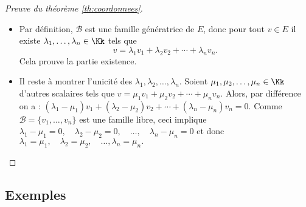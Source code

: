 \documentclass[class=report,crop=false]{standalone}
\begin{document}
\begin{proof}[Preuve du théorème \ref{th:coordonnees}]
~
\begin{itemize}
  \item Par définition, $\mathcal{B}$ est une famille génératrice de $E$,
  donc pour tout $v \in E$ il existe $\lambda_1, \ldots , \lambda_n \in \Kk$ tels que
  $$v = \lambda_1 v_1 + \lambda_2 v_2 + \cdots + \lambda_n v_n.$$
  Cela prouve la partie existence.

  \item Il reste à montrer l'unicité des $\lambda_1, \lambda_2, \ldots , \lambda_n$.
  Soient $\mu_1, \mu_2, \dots , \mu_n \in \Kk$ d'autres scalaires tels que
  $v = \mu_1 v_1 + \mu_2 v_2 + \cdots + \mu_n v_n.$
  Alors, par différence on a :
  $ (\lambda_1 - \mu_1) v_1 + (\lambda_2 - \mu_2)v_2 + \cdots + (\lambda_n - \mu_n) v_n = 0.$
  Comme $\mathcal{B} = \{v_1, \dots , v_n\}$ est une famille libre, ceci implique
  $ \lambda_1 - \mu_1 = 0,\quad \lambda_2 - \mu_2 = 0,\quad \dots , \quad \lambda_n - \mu_n = 0$ et donc
  $\lambda_1 = \mu_1,\quad \lambda_2 = \mu_2,\quad \dots , \lambda_n = \mu_n.$
\end{itemize}

\end{proof}



\subsection{Exemples}
\end{document}
